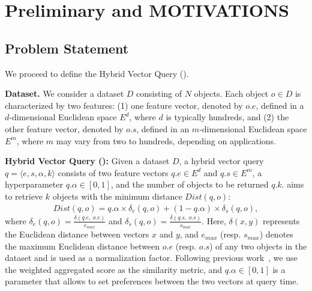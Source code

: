 \section{Preliminary and MOTIVATIONS}
\label{sec:preliminary-motivations}

\subsection{Problem Statement}
\label{sec:preliminary}
We 
proceed to define the Hybrid Vector Query (\hvq).

\noindent\textbf{Dataset.} We consider a dataset $D$ consisting of $N$ objects. Each object $o\in D$ is characterized by two features: (1) {\cheng one} feature vector, denoted by $o.e$,  defined in a $d$-dimensional Euclidean space $E^{d}$, where $d$ is typically hundreds, and (2) {\cheng the other} feature vector, denoted {\cheng by} $o.s$, defined in an $m$-dimensional Euclidean space $E^{m}$, where $m$ 
may vary from two to hundreds, depending on applications.


\noindent\textbf{Hybrid Vector Query (\hvq):} Given a dataset $D$, a hybrid vector query $q=\langle e, s, \alpha, k\rangle$ consists of 
{\cheng two feature vectors $q.e \in E^{d}$ and $q.s \in E^{m}$,}
a hyperparameter $q.\alpha\in [0,1]$, and the number of objects to be returned $q.k$. 
\hvq aims to retrieve $k$ objects with the {\cheng minimum} 
distance $Dist(q,o)$:
\begin{equation}
\begin{aligned}
    Dist(q, o) = q.\alpha \times \delta_e(q, o) + (1-q.\alpha) \times \delta_s(q, o),
\end{aligned}
\label{eq:hybird_distance}
\end{equation}
where $\delta_e(q, o)=\frac{\delta(q.e, \ o.e)}{e_{max}}$ and $\delta_s(q, o)=\frac{\delta(q.s,\ o.s)}{s_{max}}$. Here, $\delta(x, y)$ represents the Euclidean distance between vectors $x$ and $y$, and $e_{max}$ (resp. $s_{max}$) denotes the maximum Euclidean distance between $o.e$ (resp. $o.s$) of any two objects in the dataset and is used as a normalization factor. %
Following 
previous work~\cite{milvus2021}, we use the weighted aggregated score as the similarity metric, and $q.\alpha \in [0, 1]$ is a %
parameter that allows to set preferences between the two vectors at query time. 


